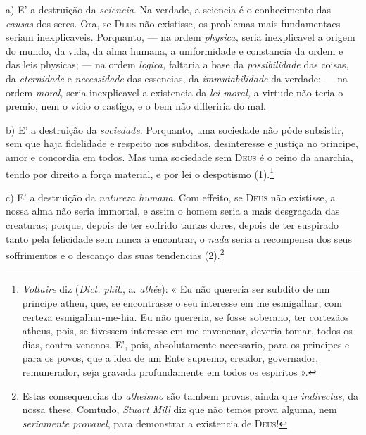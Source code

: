  a) E' a destruição da \emph{sciencia}. Na verdade, a sciencia é o conhecimento das \emph{causas} dos seres. Ora, se \textsc{Deus} não existisse, os problemas mais fundamentaes seriam inexplicaveis. Porquanto, --- na ordem \emph{physica,} seria inexplicavel a origem do mundo, da vida, da alma humana, a uniformidade e constancia da ordem e das leis physicas; --- na ordem \emph{logica,} faltaria a base da \emph{possibilidade} das coisas, da \emph{eternidade} e \emph{necessidade} das essencias, da \emph{immutabilidade} da verdade; --- na ordem \emph{moral,} seria inexplicavel a existencia da \emph{lei moral,} a virtude não teria o premio, nem o vicio o castigo, e o bem não differiria do mal.

b) E' a destruição da \emph{sociedade}. Porquanto, uma sociedade não póde subsistir, sem que haja fidelidade e respeito nos subditos, desinteresse e justiça no principe, amor e concordia em todos. Mas uma sociedade sem \textsc{Deus} é o reino da anarchia, tendo por direito a força material, e por lei o despotismo (1).\footnote{\emph{Voltaire} diz (\emph{Dict. phil.}, a. \emph{athée}): « Eu não quereria ser subdito de um principe atheu, que, se encontrasse o seu interesse em me esmigalhar, com certeza esmigalhar-me-hia. Eu não quereria, se fosse soberano, ter cortezãos atheus, pois, se tivessem interesse em me envenenar, deveria tomar, todos os dias, contra-venenos. E', pois, absolutamente necessario, para os principes e para os povos, que a idea de um Ente supremo, creador, governador, remunerador, seja gravada profundamente em todos os espiritos ».}

c) E' a destruição da \emph{natureza humana}. Com effeito, se \textsc{Deus} não existisse, a nossa alma não seria immortal, e assim o homem seria a mais desgraçada das creaturas; porque, depois de ter soffrido tantas dores, depois de ter suspirado tanto pela felicidade sem nunca a encontrar, o \emph{nada} seria a recompensa dos seus soffrimentos e o descanço das suas tendencias (2).\footnote{Estas consequencias do \emph{atheismo} são tambem provas, ainda que \emph{indirectas}, da nossa these. Comtudo, \emph{Stuart Mill} diz que não temos prova alguma, nem \emph{seriamente provavel}, para demonstrar a existencia de \textsc{Deus}!}
